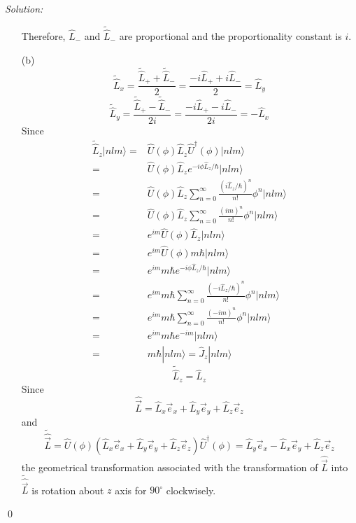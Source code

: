 \documentclass[10pt,a4paper]{article}
\newenvironment{sol}
    {\emph{Solution:}
    }
    {
    \qed
    }
\begin{document}
\begin{sol}
\begin{itemize}
Therefore, $\hat{L}_-$ and $\tilde{\hat{L}}_-$ are proportional and the proportionality constant is $i$.
\item[(b)]
\begin{equation}
\tilde{\hat{L}}_x=\frac{\tilde{\hat{L}}_++\tilde{\hat{L}}_-}{2}=\frac{-i\hat{L}_++i\hat{L}_-}{2}=\hat{L}_y
\end{equation}
\begin{equation}
\tilde{\hat{L}}_y=\frac{\tilde{\hat{L}}_+-\tilde{\hat{L}}_-}{2i}=\frac{-i\hat{L}_+-i\hat{L}_-}{2i}=-\hat{L}_x
\end{equation}
Since
\begin{align}
\nonumber\tilde{\hat{L}}_z|nlm\rangle=&\hat{U}(\phi)\hat{L}_z\hat{U}^{\dagger}(\phi)|nlm\rangle\\
\nonumber=&\hat{U}(\phi)\hat{L}_ze^{-i\phi\hat{L}_z/\hbar}|nlm\rangle\\
\nonumber=&\hat{U}(\phi)\hat{L}_z\sum_{n=0}^{\infty}\frac{(i\hat{L}_z/\hbar)^n}{n!}\phi^n|nlm\rangle\\
\nonumber=&\hat{U}(\phi)\hat{L}_z\sum_{n=0}^{\infty}\frac{(im)^n}{n!}\phi^n|nlm\rangle\\
\nonumber=&e^{im}\hat{U}(\phi)\hat{L}_z|nlm\rangle\\
\nonumber=&e^{im}\hat{U}(\phi)m\hbar|nlm\rangle\\
\nonumber=&e^{im}m\hbar e^{-i\phi\hat{L}_z/\hbar}|nlm\rangle\\
\nonumber=&e^{im}m\hbar\sum_{n=0}^{\infty}\frac{(-i\hat{L}_z/\hbar)^n}{n!}\phi^n|nlm\rangle\\
\nonumber=&e^{im}m\hbar\sum_{n=0}^{\infty}\frac{(-im)^n}{n!}\phi^n|nlm\rangle\\
\nonumber=&e^{im}m\hbar e^{-im}|nlm\rangle\\
=&m\hbar|nlm\rangle=\hat{J}_z|nlm\rangle
\end{align}
\begin{equation}
\tilde{\hat{L}}_z=\hat{L}_z
\end{equation}
Since
\begin{equation}
\hat{\vec{L}}=\hat{L}_x\vec{e}_x+\hat{L}_y\vec{e}_y+\hat{L}_z\vec{e}_z
\end{equation}
and
\begin{equation}
\tilde{\hat{\vec{L}}}=\hat{U}(\phi)(\hat{L}_x\vec{e}_x+\hat{L}_y\vec{e}_y+\hat{L}_z\vec{e}_z)\hat{U}^{\dagger}(\phi)=\hat{L}_y\vec{e}_x-\hat{L}_x\vec{e}_y+\hat{L}_z\vec{e}_z
\end{equation}
the geometrical transformation associated with the transformation of $\hat{\vec{L}}$ into $\tilde{\hat{\vec{L}}}$ is rotation about $z$ axis for $90^{\circ}$ clockwisely.

\end{itemize}
\end{sol}
\end{document}
